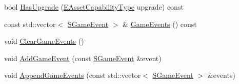 \begin{DoxyCompactItemize}
\item 
bool \hyperlink{classCPlayerData_abba8a81a8d4d8309e8cd68016ee1900b}{Has\+Upgrade} (\hyperlink{GameDataTypes_8h_a35b98ce26aca678b03c6f9f76e4778ce}{E\+Asset\+Capability\+Type} upgrade) const
\item 
const std\+::vector$<$ \hyperlink{structSGameEvent}{S\+Game\+Event} $>$ \& \hyperlink{classCPlayerData_ab82e14be0012e6bedfa2035e1c95ae81}{Game\+Events} () const
\item 
void \hyperlink{classCPlayerData_a74cbe8bf72037ca113c9c40ae7bca5ec}{Clear\+Game\+Events} ()
\item 
void \hyperlink{classCPlayerData_a3f49383e8ba2fbba8e6193919f014413}{Add\+Game\+Event} (const \hyperlink{structSGameEvent}{S\+Game\+Event} \&event)
\item 
void \hyperlink{classCPlayerData_a058ba3a3acf824fe4707d5e8a5024806}{Append\+Game\+Events} (const std\+::vector$<$ \hyperlink{structSGameEvent}{S\+Game\+Event} $>$ \&events)
\end{DoxyCompactItemize}
